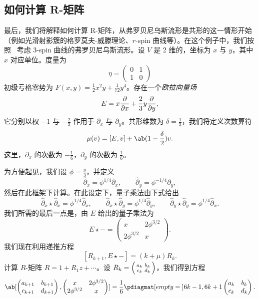\documentclass{amsart}
\theoremstyle{definition}
\theoremstyle{remark}
\theoremstyle{plain}
\theoremstyle{definition}
\theoremstyle{remark}
\newcommand{\1}{\mathbf{1}}
\newcommand{\2}{\mathbf{2}}
\newcommand{\3}{\mathbf{3}}
\begin{document}
\subsection{如何计算 R-矩阵}%
\label{sub:How to compute the R-matrix}

最后，我们将解释如何计算 R-矩阵，从弗罗贝尼乌斯流形是共形的这一情形开始（例如光滑射影簇的格罗莫夫-威滕理论、\(r\)-spin 曲线等）。在这个例子中，我们按照~\cite{PPZ2015} 考虑 3-spin 曲线的弗罗贝尼乌斯流形。设 \(V\) 是 2 维的，坐标为 \(x\) 与 \(y\)，其中 \(x\) 对应单位。度量为
\[ \eta = \begin{pmatrix}
    0 & 1 \\
    1 & 0
\end{pmatrix} \]
初级亏格零势为 \(F(x,y) = \frac{1}{2} x^2 y + \frac{1}{72} y^4\)。存在一个\textit{欧拉向量场}
\[ E = x \pdv{}{x} + \frac{2}{3} y \pdv{}{y}, \]
它分别以权 \(-1\) 与 \(-\frac{2}{3}\) 作用于 \(\partial_x\) 与 \(\partial_y\)。共形维数为 \(\delta = \frac{1}{3}\)，我们将定义次数算符
\[ \mu(v) = [E,v] + \ab(1 - \frac{\delta}{2})v. \]
这里，\(\partial_x\) 的次数为 \(-\frac{1}{6}\)，\(\partial_y\) 的次数为 \(\frac{1}{6}\)。

为方便起见，我们设 \(\phi = \frac{y}{3}\)，并定义
\[ \hat{\partial}_x = \phi^{1/4} \partial_x, \qquad \hat{\partial}_y = \phi^{-1/4} \partial_y, \]
然后在此框架下计算。在此设定下，量子乘法由下式给出
\[ \hat{\partial}_x \star \hat{\partial}_x = \phi^{1/4} \hat{\partial}_x, \qquad \hat{\partial}_x \star \hat{\partial}_y = \phi^{1/4} \hat{\partial}_y, \qquad \hat{\partial}_y \star \hat{\partial}_y = \phi^{1/4} \hat{\partial}_x. \]
我们所需的最后一点是，由 \(E\) 给出的量子乘法为
\[ E \star - = \begin{pmatrix}
    x & 2 \phi^{3/2} \\
    2 \phi^{3/2} & x 
\end{pmatrix}. \]
我们现在利用递推方程
\[ [R_{k+1}, E \star -] = (k + \mu) R_k. \]
计算 \(R\)-矩阵 \(R = 1 + R_1 z + \cdots\)。设 \(R_k = \begin{psmallmatrix}
    a_k & b_k \\
    c_k & d_k
\end{psmallmatrix}\)，我们得到方程
\[ \ab[
    \begin{pmatrix}
        a_{k+1} & b_{k+1} \\
        c_{k+1} & d_{k+1}
    \end{pmatrix}, \begin{pmatrix}
        x & 2 \phi^{3/2} \\
        2 \phi^{3/2} & x 
    \end{pmatrix}
] = \frac{1}{6} \pdiagmat[empty={}]{6k-1, 6k+1} \begin{pmatrix}
    a_k & b_k \\
    c_k & d_k 
\end{pmatrix}. \]
\end{document}

